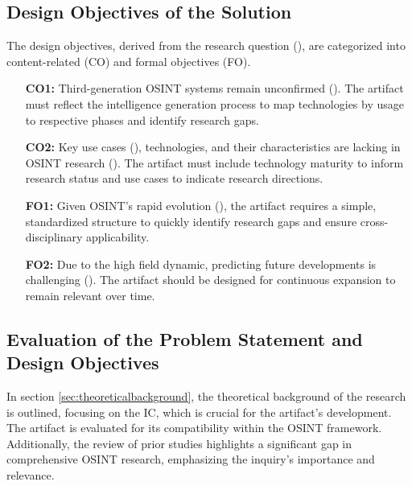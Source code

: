 \documentclass[10pt]{article}
\begin{document}
\subsection{Design Objectives of the Solution} \label{sec:designobjectives}


The design objectives, derived from the research question (\cite{Peffers.2007}), are categorized into content-related (CO) and formal objectives (FO).

\begin{itemize}
    \item[\textbf{CO1:}] Third-generation OSINT systems remain unconfirmed (\cite{Ghioni.2023}). The artifact must reflect the intelligence generation process to map technologies by usage to respective phases and identify research gaps.
    \item[\textbf{CO2:}] Key use cases (\cite{AlKilani.2021, Dokman.2020, Ghioni.2023}), technologies, and their characteristics are lacking in OSINT research (\cite{Ish.2022}). The artifact must include technology maturity to inform research status and use cases to indicate research directions.
    \item[\textbf{FO1:}] Given OSINT's rapid evolution (\cite{Ghioni.2023}), the artifact requires a simple, standardized structure to quickly identify research gaps and ensure cross-disciplinary applicability.
    \item[\textbf{FO2:}] Due to the high field dynamic, predicting future developments is challenging (\cite{Benes.2013}). The artifact should be designed for continuous expansion to remain relevant over time.
\end{itemize}

\subsection{Evaluation of the Problem Statement and Design Objectives} \label{sec:eval}
In section \ref{sec:theoreticalbackground}, the theoretical background of the research is outlined, focusing on the IC, which is crucial for the artifact's development. The artifact is evaluated for its compatibility within the OSINT framework. Additionally, the review of prior studies highlights a significant gap in comprehensive OSINT research, emphasizing the inquiry's importance and relevance.
\end{document}
